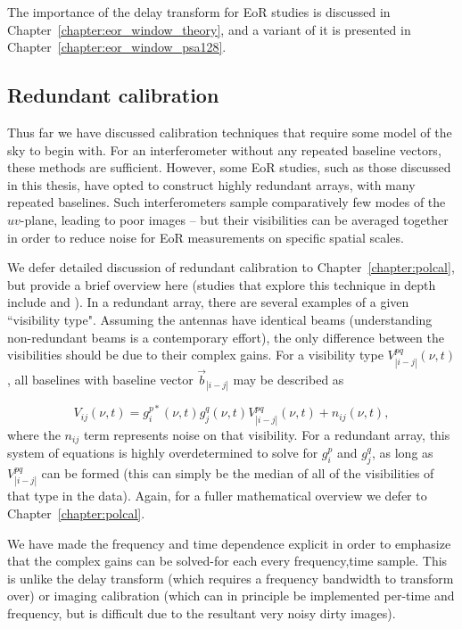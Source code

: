 The importance of the delay transform for EoR studies is discussed in Chapter~\ref{chapter:eor_window_theory}, and a variant of it is presented in Chapter~\ref{chapter:eor_window_psa128}.

\subsection{Redundant calibration}

Thus far we have discussed calibration techniques that require some model of the sky to begin with. For an interferometer without any repeated baseline vectors, these methods are sufficient. However, some EoR studies, such as those discussed in this thesis, have opted to construct highly redundant arrays, with many repeated baselines. Such interferometers sample comparatively few modes of the $uv$-plane, leading to poor images -- but their visibilities can be averaged together in order to reduce noise for EoR measurements on specific spatial scales.

We defer detailed discussion of redundant calibration to Chapter~\ref{chapter:polcal}, but provide a brief overview here (studies that explore this technique in depth include \cite{Wieringa.92, Liu.10, Zheng.14} and \cite{Dillon.17}). In a redundant array, there are several examples of a given ``visibility type". Assuming the antennas have identical beams (understanding non-redundant beams is a contemporary effort), the only difference between the visibilities should be due to their complex gains. For a visibility type $V^{pq}_{|i-j|}(\nu, t)$, all baselines with baseline vector $\vec{b}_{|i-j|}$ may be described as 

\begin{equation}
V_{ij}(\nu, t) = g^{p*}_i(\nu, t)  g^{q}_j(\nu, t) V^{pq}_{|i-j|}(\nu, t) + n_{ij}(\nu,t),
\label{eq:interferometry_redcal}
\end{equation}
where the $n_{ij}$ term represents noise on that visibility. For a redundant array, this system of equations is highly overdetermined to solve for $g^p_i$ and $ g^{q}_j$, as long as $V^{pq}_{|i-j|}$ can be formed (this can simply be the median of all of the visibilities of that type in the data). Again, for a fuller mathematical overview we defer to Chapter~\ref{chapter:polcal}.

We have made the frequency and time dependence explicit in order to emphasize that the complex gains can be solved-for each every frequency,time sample. This is unlike the delay transform (which requires a frequency bandwidth to transform over) or imaging calibration (which can in principle be implemented per-time and frequency, but is difficult due to the resultant very noisy dirty images). 

